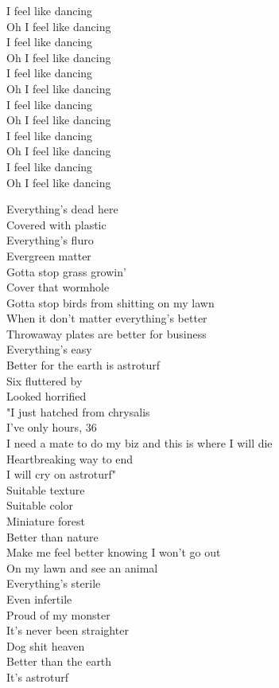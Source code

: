 I feel like dancing \\
Oh I feel like dancing \\
I feel like dancing \\
Oh I feel like dancing \\
I feel like dancing \\
Oh I feel like dancing \\
I feel like dancing \\
Oh I feel like dancing \\
I feel like dancing \\
Oh I feel like dancing \\
I feel like dancing \\
Oh I feel like dancing \\




Everything's dead here \\
Covered with plastic \\
Everything's fluro \\
Evergreen matter \\
Gotta stop grass growin' \\
Cover that wormhole \\
Gotta stop birds from shitting on my lawn \\
When it don't matter everything's better \\
Throwaway plates are better for business \\
Everything's easy \\
Better for the earth is astroturf \\

Six  fluttered by \\
Looked horrified \\
"I just hatched from chrysalis \\
I've only hours, 36 \\
I need a mate to do my biz and this is where I will die \\
Heartbreaking way to end \\
I will cry on astroturf" \\

Suitable texture \\
Suitable color \\
Miniature forest \\
Better than nature \\
Make me feel better knowing I won't go out \\
On my lawn and see an animal \\
Everything's sterile \\
Even infertile \\
Proud of my monster \\
It's never been straighter \\
Dog shit heaven \\
Better than the earth \\
It's astroturf \\

